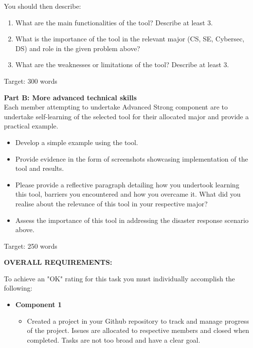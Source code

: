 \documentclass[a4paper, 11pt]{report}
\begin{document}
\begin{enumerate}
You should then describe:
\begin{enumerate}
    \item What are the main functionalities of the tool? Describe at least 3.
    \item What is the importance of the tool in the relevant major (CS, SE, Cybersec, DS) and role in the given problem above?
    \item What are the weaknesses or limitations of the tool? Describe at least 3.
\end{enumerate}
Target: 300 words

\vspace{4ex}

\textbf{Part B: More advanced technical skills}\\

Each member attempting to undertake Advanced Strong component are to undertake self-learning of the selected tool for their allocated major and provide a practical example.

\begin{itemize}
    \item Develop a simple example using the tool.
    \item Provide evidence in the form of screenshots showcasing implementation of the tool and results.
    \item Please provide a reflective paragraph detailing how you undertook learning this tool, barriers you encountered and how you overcame it. What did you realise about the relevance of this tool in your respective major?
    \item Assess the importance of this tool in addressing the disaster response scenario above.
\end{itemize}

Target: 250 words

\vspace{6ex}

\textbf{OVERALL REQUIREMENTS:}

To achieve an "OK" rating for this task you must individually accomplish the following:
\begin{itemize}
\item \textbf{Component 1}
	\begin{itemize}
	\item Created a project in your Github repository to track and manage progress of the project. Issues are allocated to respective members and closed when completed. Tasks are not too broad and have a clear goal.
    \end{itemize}
		

\end{itemize}
\end{enumerate}
\end{document}
